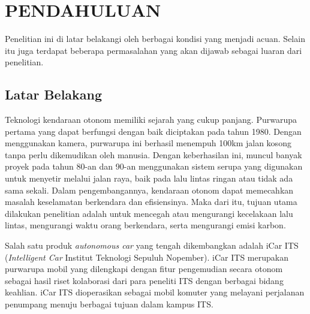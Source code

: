 \chapter{PENDAHULUAN}
\label{chap:pendahuluan}


Penelitian ini di latar belakangi oleh berbagai kondisi yang menjadi acuan. Selain itu juga terdapat beberapa permasalahan yang akan dijawab sebagai luaran dari penelitian.

\section{Latar Belakang}
\label{sec:latarbelakang}

Teknologi kendaraan otonom memiliki sejarah yang cukup panjang. Purwarupa pertama yang dapat berfungsi dengan baik diciptakan pada tahun 1980. Dengan menggunakan kamera, purwarupa ini berhasil menempuh 100km jalan kosong tanpa perlu dikemudikan oleh manusia. Dengan keberhasilan ini, muncul banyak proyek pada tahun 80-an dan 90-an menggunakan sistem serupa yang digunakan untuk menyetir melalui jalan raya, baik pada lalu lintas ringan atau tidak ada sama sekali. Dalam pengembangannya, kendaraan otonom dapat memecahkan masalah keselamatan berkendara dan efisiensinya. Maka dari itu, tujuan utama dilakukan penelitian adalah untuk mencegah atau mengurangi kecelakaan lalu lintas, mengurangi waktu orang berkendara, serta mengurangi emisi karbon.\cite{cit:autonomous_vehicle_future}\par

Salah satu produk \textit{autonomous car }yang tengah dikembangkan adalah iCar ITS (\textit{Intelligent Car }Institut Teknologi Sepuluh Nopember). iCar ITS merupakan purwarupa mobil yang dilengkapi dengan fitur pengemudian secara otonom sebagai hasil riset kolaborasi dari para peneliti ITS dengan berbagai bidang keahlian.\cite{cit:icar_menristekbrin} iCar ITS dioperasikan sebagai mobil komuter yang melayani perjalanan penumpang menuju berbagai tujuan dalam kampus ITS.\cite{cit:icar_its_news}

\iffalse
Salah satu produk kendaraan otonom yang tengah dikembangkan adalah iCar ITS, sebuah mobil yang dilengkapi dengan fitur pengemudian secara otonom yang akan berkeliling di kampus ITS sebagai mobil komuter untuk mengantarkan penumpang menuju berbagai lokasi yang di kehendaki di dalam kampus. Mobil otonom yang dikembangkan oleh ITS dengan nama iCar ITS (Intelligent Car ITS) merupakan purwarupa mobil otonom hasil kolaborasi dari peneliti-peneliti di ITS dari berbagai bidang keahlian. iCar ITS dioperasikan sebagai mobil komuter yang melayani perjalanan dalam kampus ITS.\par
\fi

